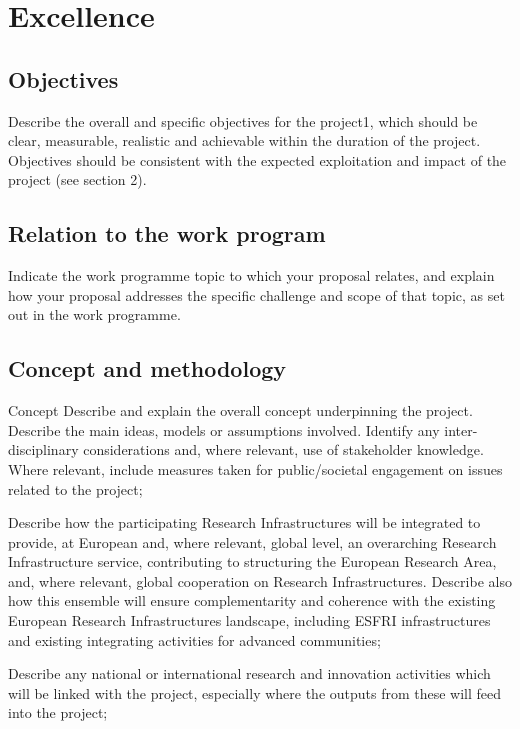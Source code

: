 \chapter{Excellence}



\section{Objectives}

\begin{todo}{}\color{red}
  Describe the overall and specific objectives for the project1, which should be clear, measurable, realistic and achievable within the duration of the project. Objectives should be consistent with the expected exploitation and impact of the project (see section 2).
\end{todo}



\section{Relation to the work program}

\begin{todo}{}\color{red}
  Indicate the work programme topic to which your proposal relates, and explain how your proposal addresses the specific challenge and scope of that topic, as set out in the work programme.
\end{todo}



\section{Concept and methodology}

\begin{todo}{Concept}\color{red}
Describe and explain the overall concept underpinning the project. Describe the main ideas, models or assumptions involved. Identify any inter-disciplinary considerations and, where relevant, use of stakeholder knowledge. Where relevant, include measures taken for public/societal engagement on issues related to the project;
  
Describe how the participating Research Infrastructures will be integrated to provide, at European and, where relevant, global level, an overarching Research Infrastructure service, contributing to structuring the European Research Area, and, where relevant, global cooperation on Research Infrastructures. Describe also how this ensemble will ensure complementarity and coherence with the existing European Research Infrastructures landscape, including ESFRI infrastructures and existing integrating activities for advanced communities;

Describe any national or international research and innovation activities which will be linked with the project, especially where the outputs from these will feed into the project;
\end{todo}

